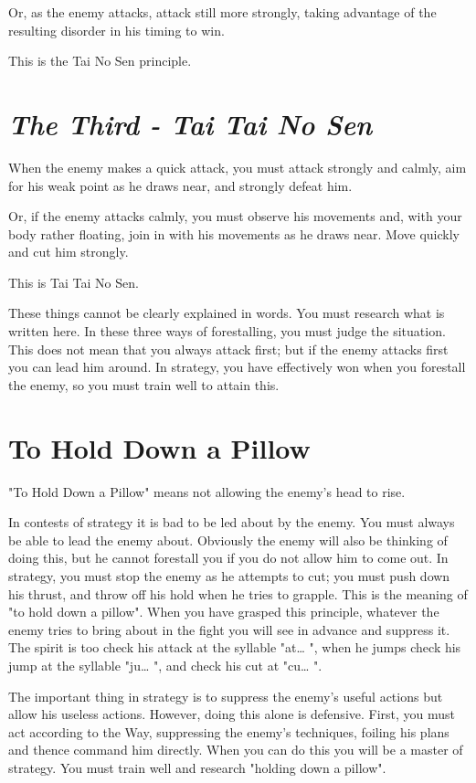 \documentclass[12pt]{report}
\begin{document}
Or, as the enemy attacks, attack still more strongly, taking advantage of the resulting disorder in his timing to win.

This is the Tai No Sen principle.

\section*{\emph{The Third - Tai Tai No Sen}}

When the enemy makes a quick attack, you must attack strongly and calmly, aim for his weak point as he draws near, and strongly defeat him.

Or, if the enemy attacks calmly, you must observe his movements and, with your body rather floating, join in with his movements as he draws near. Move quickly and cut him strongly.

This is Tai Tai No Sen.

These things cannot be clearly explained in words. You must research what is written here. In these three ways of forestalling, you must judge the situation. This does not mean that you always attack first; but if the enemy attacks first you can lead him around. In strategy, you have effectively won when you forestall the enemy, so you must train well to attain this.
\section*{To Hold Down a Pillow}

"To Hold Down a Pillow" means not allowing the enemy's head to rise.

In contests of strategy it is bad to be led about by the enemy. You must always be able to lead the enemy about. Obviously the enemy will also be thinking of doing this, but he cannot forestall you if you do not allow him to come out. In strategy, you must stop the enemy as he attempts to cut; you must push down his thrust, and throw off his hold when he tries to grapple. This is the meaning of "to hold down a pillow". When you have grasped this principle, whatever the enemy tries to bring about in the fight you will see in advance and suppress it. The spirit is too check his attack at the syllable "at… ", when he jumps check his jump at the syllable "ju… ", and check his cut at "cu… ".

The important thing in strategy is to suppress the enemy's useful actions but allow his useless actions. However, doing this alone is defensive. First, you must act according to the Way, suppressing the enemy's techniques, foiling his plans and thence command him directly. When you can do this you will be a master of strategy. You must train well and research "holding down a pillow".
\end{document}
